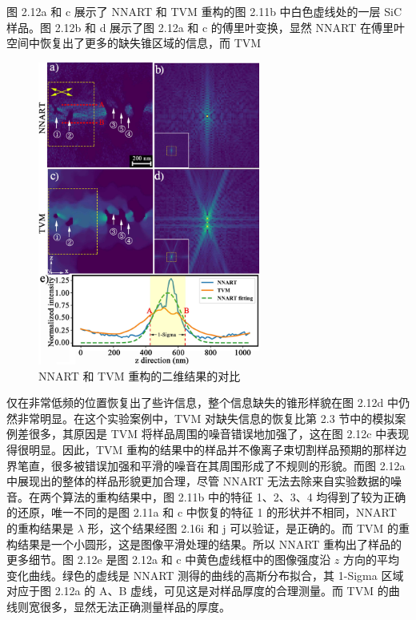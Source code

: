  图 2.12a 和 c 展示了 NNART 和 TVM 重构的图 2.11b 中白色虚线处的一层 SiC 样品。图 2.12b 和 d 展示了图 2.12a 和 c 的傅里叶变换，显然 NNART 在傅里叶空间中恢复出了更多的缺失锥区域的信息，而 TVM\begin{figure}[b!]
 	\vspace{\baselineskip}
 	\centering
 	\includegraphics[width=0.65\textwidth]{../3.9/39}
 	\caption{NNART 和 TVM 重构的二维结果的对比}\label{fig:39}
 	\song{}
 \end{figure}仅在非常低频的位置恢复出了些许信息，整个信息缺失的锥形样貌在图 2.12d 中仍然非常明显。在这个实验案例中，TVM 对缺失信息的恢复比第 2.3 节中的模拟案例差很多，其原因是 TVM 将样品周围的噪音错误地加强了，这在图 2.12c 中表现得很明显。因此，TVM 重构的结果中的样品并不像离子束切割样品预期的那样边界笔直，很多被错误加强和平滑的噪音在其周围形成了不规则的形貌。而图 2.12a 中展现出的整体的样品形貌更加合理，尽管 NNART 无法去除来自实验数据的噪音。在两个算法的重构结果中，图 2.11b 中的特征 1、2、3、4 均得到了较为正确的还原，唯一不同的是图 2.11a 和 c 中恢复的特征 1 的形状并不相同，NNART 的重构结果是 $\lambda$ 形，这个结果经图 2.16i 和 j 可以验证，是正确的。而 TVM 的重构结果是一个小圆形，这是图像平滑处理的结果。所以 NNART 重构出了样品的更多细节。图 2.12e 是图 2.12a 和 c 中黄色虚线框中的图像强度沿 $z$ 方向的平均变化曲线。绿色的虚线是 NNART 测得的曲线的高斯分布拟合，其 1-Sigma 区域对应于图 2.12a 的 A、B 虚线，可见这是对样品厚度的合理测量。而 TVM 的曲线则宽很多，显然无法正确测量样品的厚度。
 
